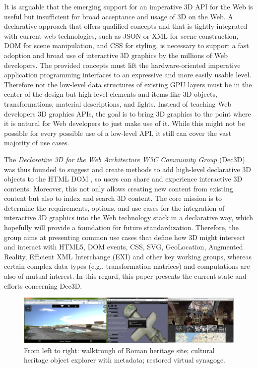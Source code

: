\documentclass{acmsiggraph}
\begin{document}
It is arguable that the emerging support for an imperative 3D API for the Web is useful but insufficient for broad acceptance and usage of 3D on the Web. A declarative approach that offers qualified concepts and that is tightly integrated with current web technologies, such as JSON or XML for scene construction, DOM for scene manipulation, and CSS for styling, is necessary to support a fast adoption and broad use of interactive 3D graphics by the millions of Web developers. The provided concepts must lift the hardware-oriented imperative application programming interfaces to an expressive and more easily usable level. Therefore not the low-level data structures of existing GPU layers must be in the center of the design but high-level elements and items like 3D objects, transformations, material descriptions, and lights. Instead of teaching Web developers 3D graphics APIs, the goal is to bring 3D graphics to the point where it is natural for Web developers to just make use of it. While this might not be possible for every possible use of a low-level API, it still can cover the vast majority of use cases.

The \textit{Declarative 3D for the Web Architecture W3C Community Group} (Dec3D) \cite{Dec3D} was thus founded to suggest and create methods to add high-level declarative 3D objects to the HTML DOM \cite{W3C-DOM}, so users can share and experience interactive 3D contents. Moreover, this not only allows creating new content from existing content but also to index and search 3D content.
The core mission is to determine the requirements, options, and use cases for the integration of interactive 3D graphics into the Web technology stack in a declarative way, which hopefully will provide a foundation for future standardization.
Therefore, the group aims at presenting common use cases that define how 3D might intersect and interact with HTML5, DOM events, CSS, SVG, GeoLocation, Augmented Reality, Efficient XML Interchange (EXI) \cite{EXI} and other key working groups, whereas certain complex data types (e.g., transformation matrices) and computations are also of mutual interest. In this regard, this paper presents the current state and efforts concerning Dec3D.

\begin{figure}%
  \centering
  \includegraphics[width=1.0\textwidth]{images/ch_apps.png}
  \caption{From left to right: walktrough of Roman heritage site; cultural heritage object explorer with metadata; restored virtual synagoge.}
  \label{fig:chApps}
\end{figure}
\end{document}
